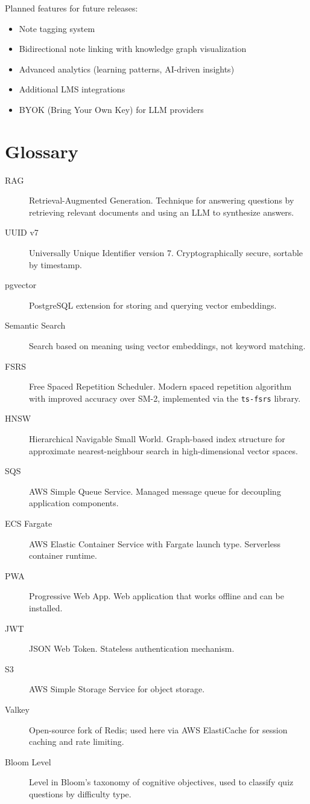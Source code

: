 \documentclass[12pt,a4paper]{article}
\begin{document}
Planned features for future releases:

\begin{itemize}
    \item Note tagging system
    \item Bidirectional note linking with knowledge graph visualization
    \item Advanced analytics (learning patterns, AI-driven insights)
    \item Additional LMS integrations
    \item BYOK (Bring Your Own Key) for LLM providers
\end{itemize}

\section{Glossary}

\begin{description}
    \item[RAG] Retrieval-Augmented Generation. Technique for answering questions by retrieving relevant documents and using an LLM to synthesize answers.
    \item[UUID v7] Universally Unique Identifier version 7. Cryptographically secure, sortable by timestamp.
    \item[pgvector] PostgreSQL extension for storing and querying vector embeddings.
    \item[Semantic Search] Search based on meaning using vector embeddings, not keyword matching.
    \item[FSRS] Free Spaced Repetition Scheduler. Modern spaced repetition algorithm with improved accuracy over SM-2, implemented via the \texttt{ts-fsrs} library.
    \item[HNSW] Hierarchical Navigable Small World. Graph-based index structure for approximate nearest-neighbour search in high-dimensional vector spaces.
    \item[SQS] AWS Simple Queue Service. Managed message queue for decoupling application components.
    \item[ECS Fargate] AWS Elastic Container Service with Fargate launch type. Serverless container runtime.
    \item[PWA] Progressive Web App. Web application that works offline and can be installed.
    \item[JWT] JSON Web Token. Stateless authentication mechanism.
    \item[S3] AWS Simple Storage Service for object storage.
    \item[Valkey] Open-source fork of Redis; used here via AWS ElastiCache for session caching and rate limiting.
    \item[Bloom Level] Level in Bloom's taxonomy of cognitive objectives, used to classify quiz questions by difficulty type.
\end{description}
\end{document}
